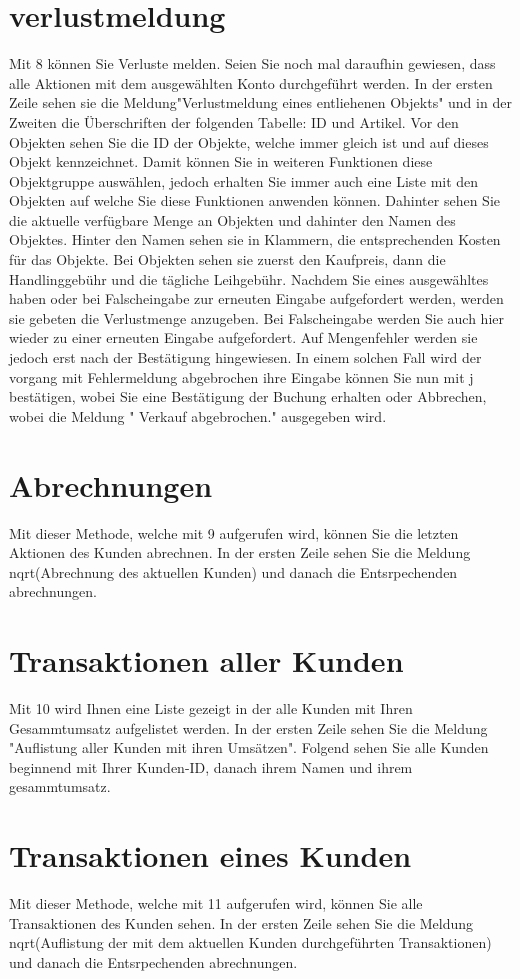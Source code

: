 ﻿\documentclass[a4paper,12pt,titlepage]{article}
\begin{document}
\section{verlustmeldung}
Mit 8 können Sie Verluste melden. Seien Sie noch mal daraufhin gewiesen, dass alle Aktionen mit dem ausgewählten Konto durchgeführt werden.
In der ersten Zeile sehen sie die Meldung"Verlustmeldung eines entliehenen Objekts" und in der Zweiten die Überschriften der folgenden Tabelle: ID und Artikel. 
Vor den Objekten sehen Sie die ID der Objekte, welche immer gleich ist und auf dieses Objekt kennzeichnet. Damit können Sie in weiteren Funktionen diese Objektgruppe auswählen, jedoch erhalten Sie immer auch eine Liste mit den Objekten auf welche Sie diese Funktionen anwenden können.
Dahinter sehen Sie die aktuelle verfügbare Menge an Objekten und dahinter den Namen des Objektes.
Hinter den Namen sehen sie in Klammern, die entsprechenden Kosten für das Objekte. Bei Objekten sehen sie zuerst den Kaufpreis, dann die Handlinggebühr und die tägliche Leihgebühr.
Nachdem Sie eines ausgewähltes  haben oder bei Falscheingabe zur erneuten Eingabe aufgefordert werden, werden sie gebeten die Verlustmenge anzugeben. Bei Falscheingabe werden Sie auch hier wieder zu einer erneuten Eingabe aufgefordert. Auf Mengenfehler werden sie jedoch erst nach der Bestätigung hingewiesen. In einem solchen Fall wird der vorgang mit Fehlermeldung abgebrochen
ihre Eingabe können Sie nun mit j bestätigen, wobei Sie eine Bestätigung der Buchung erhalten oder Abbrechen, wobei die Meldung " Verkauf abgebrochen." ausgegeben wird. 
\section{Abrechnungen}
Mit dieser Methode, welche mit 9 aufgerufen wird, können Sie die letzten Aktionen des Kunden abrechnen.
In der ersten Zeile sehen Sie die Meldung nqrt(Abrechnung des aktuellen Kunden) und danach die Entsrpechenden abrechnungen.
\section{Transaktionen aller Kunden}
Mit 10 wird Ihnen eine Liste  gezeigt in der alle Kunden mit Ihren Gesammtumsatz aufgelistet werden.
In der ersten Zeile sehen Sie die Meldung "Auflistung aller Kunden mit ihren Umsätzen". Folgend sehen Sie alle Kunden beginnend mit Ihrer Kunden-ID, danach ihrem Namen und ihrem gesammtumsatz.
\section{Transaktionen eines Kunden}
Mit dieser Methode, welche mit 11 aufgerufen wird, können Sie alle Transaktionen des Kunden sehen.
In der ersten Zeile sehen Sie die Meldung nqrt(Auflistung der mit dem aktuellen Kunden durchgeführten Transaktionen) und danach die Entsrpechenden abrechnungen.
\end{document}
